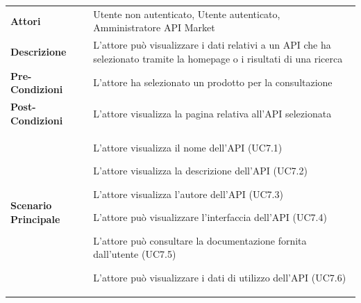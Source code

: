\begin{longtable}{ l | p{11cm}}
	\hline
	\rowcolor{Gray}
	\multicolumn{2}{c}{UC7 - Visualizzazione API}\\
	\hline
	
	 \textbf{Attori} & Utente non autenticato, Utente autenticato, Amministratore API Market \\
	\textbf{Descrizione} & L'attore può visualizzare i dati relativi a un API che ha selezionato tramite la homepage o i risultati di una ricerca  \\
	\textbf{Pre-Condizioni} & L'attore ha selezionato un prodotto per la consultazione \\
	\textbf{Post-Condizioni} & L'attore visualizza la pagina relativa all'API selezionata\\
	\textbf{Scenario Principale} & 
	\begin{enumerate*}[label=(\arabic*.),itemjoin={\newline}]
		\item L'attore visualizza il nome dell'API (UC7.1)
		\item L'attore visualizza la descrizione dell'API (UC7.2)
		\item L'attore visualizza l'autore dell'API (UC7.3)
		\item L'attore può visualizzare l'interfaccia dell'API (UC7.4)
		\item L'attore può consultare la documentazione fornita dall'utente (UC7.5)
		\item L'attore può visualizzare i dati di utilizzo dell'API  (UC7.6)
	\end{enumerate*}\\
\end{longtable}
